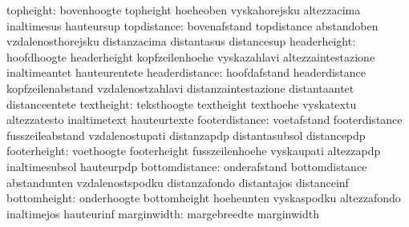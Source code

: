                        topheight: bovenhoogte                      topheight
                                  hoeheoben                        vyskahorejsku
                                  altezzacima                      inaltimesus
                                  hauteursup
                     topdistance: bovenafstand                     topdistance
                                  abstandoben                      vzdalenosthorejsku
                                  distanzacima                     distantasus
                                  distancesup
                    headerheight: hoofdhoogte                      headerheight
                                  kopfzeilenhoehe                  vyskazahlavi
                                  altezzaintestazione              inaltimeantet
                                  hauteurentete
                  headerdistance: hoofdafstand                     headerdistance
                                  kopfzeilenabstand                vzdalenostzahlavi
                                  distanzaintestazione             distantaantet
                                  distanceentete
                      textheight: teksthoogte                      textheight
                                  texthoehe                        vyskatextu
                                  altezzatesto                     inaltimetext
                                  hauteurtexte
                  footerdistance: voetafstand                      footerdistance
                                  fusszeileabstand                 vzdalenostupati
                                  distanzapdp                      distantasubsol
                                  distancepdp
                    footerheight: voethoogte                       footerheight
                                  fusszeilenhoehe                  vyskaupati
                                  altezzapdp                       inaltimesubsol
                                  hauteurpdp
                  bottomdistance: onderafstand                     bottomdistance
                                  abstandunten                     vzdalenostspodku
                                  distanzafondo                    distantajos
                                  distanceinf
                    bottomheight: onderhoogte                      bottomheight
                                  hoeheunten                       vyskaspodku
                                  altezzafondo                     inaltimejos
                                  hauteurinf
                     marginwidth: margebreedte                     marginwidth
